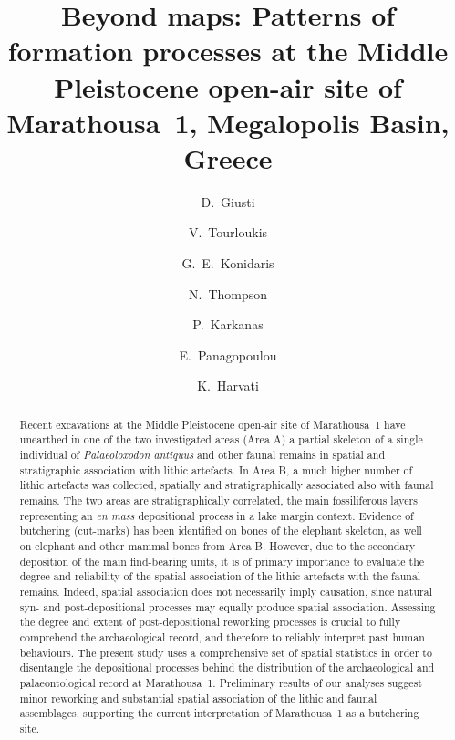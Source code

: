 \documentclass[preprint,authoryear,times]{elsarticle} %
\begin{document}
\begin{frontmatter}
  
  \title{Beyond maps: Patterns of formation processes at the Middle Pleistocene open-air site of Marathousa~1, Megalopolis Basin, Greece}
  
  \author[tue]{D.~Giusti}
  
  \author[tue]{V.~Tourloukis}
  \author[tue]{G.~E.~Konidaris}
  \author[tue]{N.~Thompson}
  \author[wiener]{P.~Karkanas}
  \author[ephoreia]{E.~Panagopoulou}
  \author[tue]{K.~Harvati}
  
  \address[tue]{Paläoanthropologie, Senckenberg Centre for Human Evolution and Palaeoenvironment, Eberhard Karls Universität Tübingen, Rümelinstr. 23, 72070 Tübingen, Germany}
  \address[wiener]{Malcolm H. Wiener Laboratory for Archaeological Science, American School of Classical Studies at Athens, Greece}
  \address[ephoreia]{Ephoreia of Palaeoanthropology-Speleology of Greece, Athens, Greece}

  \begin{abstract}
    Recent excavations at the Middle Pleistocene open-air site of Marathousa~1 have unearthed in one of the two investigated areas (Area A) a partial skeleton of a single individual of \emph{Palaeoloxodon antiquus} and other faunal remains in spatial and stratigraphic association with lithic artefacts. In Area B, a much higher number of lithic artefacts was collected, spatially and stratigraphically associated also with faunal remains. The two areas are stratigraphically correlated, the main fossiliferous layers representing an \emph{en mass} depositional process in a lake margin context. Evidence of butchering (cut-marks) has been identified on bones of the elephant skeleton, as well on elephant and other mammal bones from Area B. However, due to the secondary deposition of the main find-bearing units, it is of primary importance to evaluate the degree and reliability of the spatial association of the lithic artefacts with the faunal remains. Indeed, spatial association does not necessarily imply causation, since natural syn- and post-depositional processes may equally produce spatial association. Assessing the degree and extent of post-depositional reworking processes is crucial to fully comprehend the archaeological record, and therefore to reliably interpret past human behaviours. The present study uses a comprehensive set of spatial statistics in order to disentangle the depositional processes behind the distribution of the archaeological and palaeontological record at Marathousa~1. Preliminary results of our analyses suggest minor reworking and substantial spatial association of the lithic and faunal assemblages, supporting the current interpretation of Marathousa~1 as a butchering site.
  \end{abstract}


\end{frontmatter}
\end{document}
